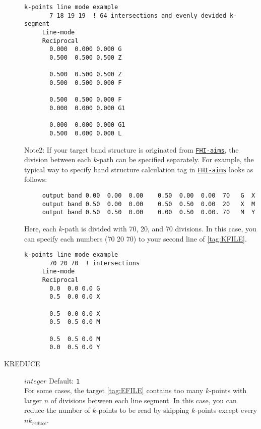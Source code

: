\documentclass[a4paper,12pt]{scrartcl}
\makeatletter
\def\namedlabel#1#2{\begingroup
    #2%
    \def\@currentlabel{#2}%
    \phantomsection\label{#1}\endgroup
}
\makeatother
\begin{document}
\begin{description}
         \begin{Verbatim}[commandchars=\\\{\},gobble=4, frame=single, framesep=2mm, 
            label= KPOINTS\_BAND $line$ $mode$ example with FLEURMaX tag, 
            labelposition=bottomline]
     k-points line mode example
       7 18 19 19  ! 64 intersections and evenly devided k-segment
     Line-mode
     Reciprocal
       0.000  0.000 0.000 G
       0.500  0.500 0.500 Z

       0.500  0.500 0.500 Z
       0.500  0.500 0.000 F
       
       0.500  0.500 0.000 F              
       0.000  0.000 0.000 G1
       
       0.000  0.000 0.000 G1
       0.500  0.000 0.000 L
        \end{Verbatim}

        Note2: If your target band structure is originated from \href{https://aimsclub.fhi-berlin.mpg.de}{\texttt{FHI-aims}}, 
        the division between each $k$-path can be specified separately. For example, the typical way to specify band structure calculation tag
        in \href{https://aimsclub.fhi-berlin.mpg.de}{\texttt{FHI-aims}} looks as follows:
        
     \begin{verbatim}
     output band 0.00  0.00  0.00    0.50  0.00  0.00  70   G  X
     output band 0.50  0.00  0.00    0.50  0.50  0.00  20   X  M
     output band 0.50  0.50  0.00    0.00  0.50  0.00. 70   M  Y
     \end{verbatim}
     
     Here, each $k$-path is divided with 70, 20, and 70 divisions.
     In this case, you can specify each numbers (70 20 70) to your second line of  \ref{tag:KFILE}.

        \begin{Verbatim}[commandchars=\\\{\},gobble=4, frame=single, framesep=2mm, 
            label= KPOINTS\_BAND $line$ $mode$ (FHI-aims type), 
            labelposition=bottomline]
     k-points line mode example
       70 20 70  ! intersections
     Line-mode
     Reciprocal
       0.0  0.0 0.0 G
       0.5  0.0 0.0 X
       
       0.5  0.0 0.0 X
       0.5  0.5 0.0 M

       0.5  0.5 0.0 M
       0.0  0.5 0.0 Y
        \end{Verbatim}        

  	
  	\item[\namedlabel{tag:KREDUCE}{KREDUCE}] $integer$ Default: \texttt{1}  \\
		For some cases, the target \ref{tag:EFILE} contains too many $k$-points with 
		larger $n$ of divisions between each line segment. In this case, 
		you can reduce the number of $k$-points to be read by skipping $k$-points except every $nk_{reduce}$. 
	

\end{description}
\end{document}
